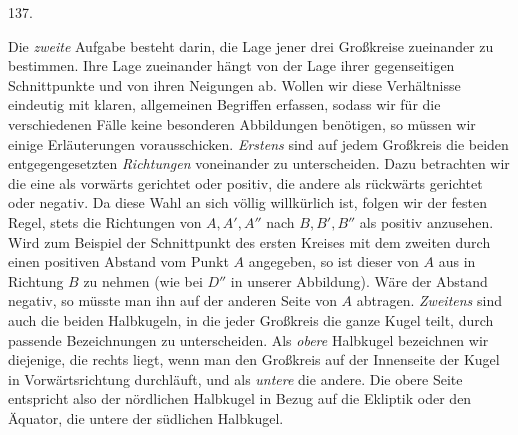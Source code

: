 \par{}\medskip
\begin{center}\hypertarget{native-183-article137}{}137.\end{center}
Die \emph{zweite} Aufgabe besteht darin, die Lage jener drei Großkreise zueinander zu bestimmen.
Ihre Lage zueinander hängt von der Lage ihrer gegenseitigen Schnittpunkte und von ihren
Neigungen ab. Wollen wir diese Verhältnisse eindeutig mit klaren, allgemeinen Begriffen
erfassen, sodass wir für die verschiedenen Fälle keine besonderen Abbildungen benötigen, so
müssen wir einige Erläuterungen vorausschicken. \emph{Erstens} sind auf jedem Großkreis die
beiden entgegengesetzten \emph{Richtungen} voneinander zu unterscheiden. Dazu betrachten wir die
eine als vorwärts gerichtet oder positiv, die andere als rückwärts gerichtet oder negativ. Da
diese Wahl an sich völlig willkürlich ist, folgen wir der festen Regel, stets die Richtungen von
$A,A',A''$ nach $B,B',B''$ als positiv anzusehen. Wird zum Beispiel der Schnittpunkt des ersten Kreises
mit dem zweiten durch einen positiven Abstand vom Punkt $A$ angegeben, so ist dieser von $A$
aus in Richtung $B$ zu nehmen (wie bei $D''$ in unserer Abbildung). Wäre der Abstand negativ,
so müsste man ihn auf der anderen Seite von $A$ abtragen. \emph{Zweitens} sind auch die beiden
Halbkugeln, in die jeder Großkreis die ganze Kugel teilt, durch passende Bezeichnungen zu
unterscheiden. Als \emph{obere} Halbkugel bezeichnen wir diejenige, die rechts liegt, wenn man
den Großkreis auf der Innenseite der Kugel in Vorwärtsrichtung durchläuft, und als \emph{untere}
die andere. Die obere Seite entspricht also der nördlichen Halbkugel in Bezug auf die Ekliptik
oder den Äquator, die untere der südlichen Halbkugel.

